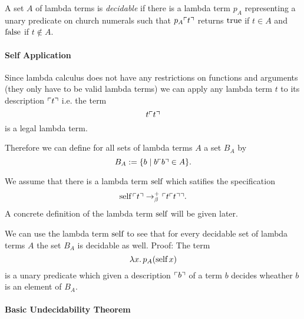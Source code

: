 \begin{definition}
  A set $A$ of lambda terms is \emph{decidable} if there is a lambda term
  $p_A$ representing a unary predicate on church numerals such that $p_A
  \ulcorner t \urcorner$ returns $\text{true}$ if $t \in A$ and $\text{false}$ if $t \notin A$.
\end{definition}

\paragraph{Self Application} Since lambda calculus does not have any
restrictions on functions and arguments (they only have to be valid lambda
terms) we can apply any lambda term $t$ to its description $\ulcorner t \urcorner$
i.e. the term
$$ t \ulcorner t \urcorner$$
is a legal lambda term.

Therefore we can define for all sets of lambda terms $A$ a set $B_A$ by
$$ B_A := \{b \mid b \ulcorner b \urcorner \in A\}.$$

We assume that there is a lambda term $\text{self}$ which satifies the specification
$$ \text{self}\, \ulcorner t \urcorner \to^+_\beta \ulcorner t \ulcorner t \urcorner \urcorner.$$
A concrete definition of the lambda term $\text{self} $ will be given later.

We can use the lambda term $\text{self} $ to see that for every decidable set of
lambda terms $A$ the set $B_A$ is decidable as well. Proof: The term
$$\lambda x.\, p_A (\text{self}\, x)$$
is a unary predicate which given a description $\ulcorner b \urcorner$ of a term $b$
decides wheather $b$ is an element of $B_A$.

\paragraph{Basic Undecidability Theorem}

